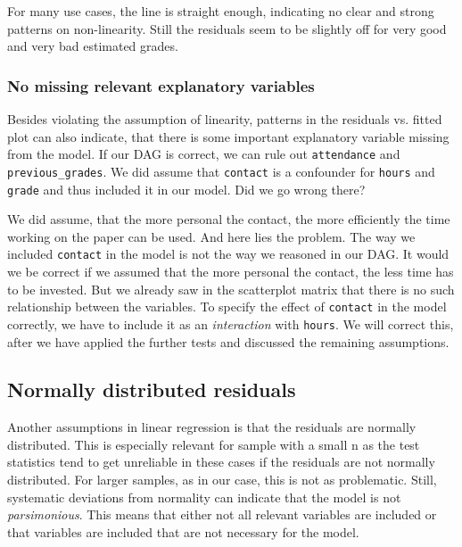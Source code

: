 \documentclass[
]{book}
\begin{document}
For many use cases, the line is straight enough, indicating no clear and strong
patterns on non-linearity. Still the residuals seem to be slightly off for very
good and very bad estimated grades.

\hypertarget{no-missing-relevant-explanatory-variables}{%
\subsubsection{No missing relevant explanatory variables}\label{no-missing-relevant-explanatory-variables}}

Besides violating the assumption of linearity, patterns in the residuals vs.
fitted plot can also indicate, that there is some important explanatory variable
missing from the model. If our DAG is correct, we can rule out \texttt{attendance} and
\texttt{previous\_grades}. We did assume that \texttt{contact} is a confounder for \texttt{hours} and
\texttt{grade} and thus included it in our model. Did we go wrong there?

We did assume, that the more personal the contact, the more efficiently the time
working on the paper can be used. And here lies the problem. The way we included
\texttt{contact} in the model is not the way we reasoned in our DAG. It would we be
correct if we assumed that the more personal the contact, the less time has to
be invested. But we already saw in the scatterplot matrix that there is no such
relationship between the variables. To specify the effect of \texttt{contact} in the
model correctly, we have to include it as an \emph{interaction} with \texttt{hours}.
We will correct this, after we have applied the further tests and discussed the
remaining assumptions.

\hypertarget{normally-distributed-residuals}{%
\subsection{Normally distributed residuals}\label{normally-distributed-residuals}}

Another assumptions in linear regression is that the residuals are normally
distributed. This is especially relevant for sample with a small n as the
test statistics tend to get unreliable in these cases if the residuals are not
normally distributed. For larger samples, as in our case, this is not as
problematic. Still, systematic deviations from normality can indicate that the
model is not \emph{parsimonious}. This means that either not all relevant variables
are included or that variables are included that are not necessary for the model.
\end{document}
